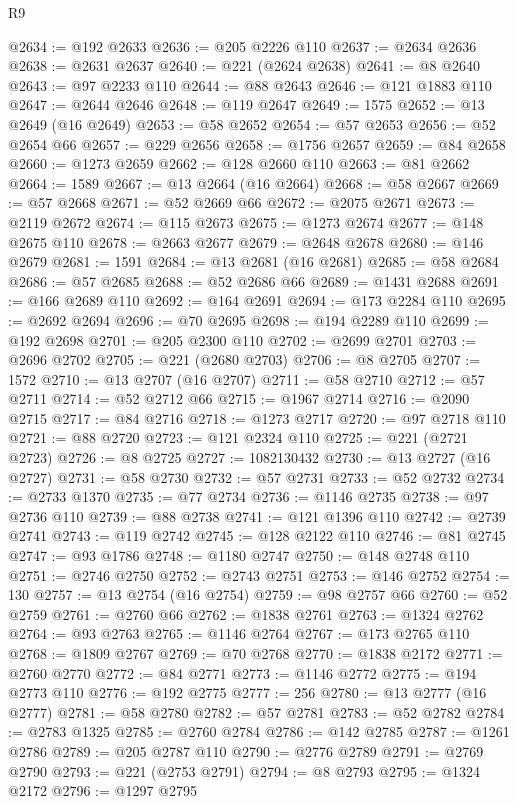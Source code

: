 \begin{lexlean}{R9}
\begin{coremodule}
@2634 := @192 @2633
@2636 := @205 @2226 @110
@2637 := @2634 @2636
@2638 := @2631 @2637
@2640 := @221 (@2624 @2638)
@2641 := @8 @2640
@2643 := @97 @2233 @110
@2644 := @88 @2643
@2646 := @121 @1883 @110
@2647 := @2644 @2646
@2648 := @119 @2647
@2649 := 1575
@2652 := @13 @2649 (@16 @2649)
@2653 := @58 @2652
@2654 := @57 @2653
@2656 := @52 @2654 @66
@2657 := @229 @2656
@2658 := @1756 @2657
@2659 := @84 @2658
@2660 := @1273 @2659
@2662 := @128 @2660 @110
@2663 := @81 @2662
@2664 := 1589
@2667 := @13 @2664 (@16 @2664)
@2668 := @58 @2667
@2669 := @57 @2668
@2671 := @52 @2669 @66
@2672 := @2075 @2671
@2673 := @2119 @2672
@2674 := @115 @2673
@2675 := @1273 @2674
@2677 := @148 @2675 @110
@2678 := @2663 @2677
@2679 := @2648 @2678
@2680 := @146 @2679
@2681 := 1591
@2684 := @13 @2681 (@16 @2681)
@2685 := @58 @2684
@2686 := @57 @2685
@2688 := @52 @2686 @66
@2689 := @1431 @2688
@2691 := @166 @2689 @110
@2692 := @164 @2691
@2694 := @173 @2284 @110
@2695 := @2692 @2694
@2696 := @70 @2695
@2698 := @194 @2289 @110
@2699 := @192 @2698
@2701 := @205 @2300 @110
@2702 := @2699 @2701
@2703 := @2696 @2702
@2705 := @221 (@2680 @2703)
@2706 := @8 @2705
@2707 := 1572
@2710 := @13 @2707 (@16 @2707)
@2711 := @58 @2710
@2712 := @57 @2711
@2714 := @52 @2712 @66
@2715 := @1967 @2714
@2716 := @2090 @2715
@2717 := @84 @2716
@2718 := @1273 @2717
@2720 := @97 @2718 @110
@2721 := @88 @2720
@2723 := @121 @2324 @110
@2725 := @221 (@2721 @2723)
@2726 := @8 @2725
@2727 := 1082130432
@2730 := @13 @2727 (@16 @2727)
@2731 := @58 @2730
@2732 := @57 @2731
@2733 := @52 @2732
@2734 := @2733 @1370
@2735 := @77 @2734
@2736 := @1146 @2735
@2738 := @97 @2736 @110
@2739 := @88 @2738
@2741 := @121 @1396 @110
@2742 := @2739 @2741
@2743 := @119 @2742
@2745 := @128 @2122 @110
@2746 := @81 @2745
@2747 := @93 @1786
@2748 := @1180 @2747
@2750 := @148 @2748 @110
@2751 := @2746 @2750
@2752 := @2743 @2751
@2753 := @146 @2752
@2754 := 130
@2757 := @13 @2754 (@16 @2754)
@2759 := @98 @2757 @66
@2760 := @52 @2759
@2761 := @2760 @66
@2762 := @1838 @2761
@2763 := @1324 @2762
@2764 := @93 @2763
@2765 := @1146 @2764
@2767 := @173 @2765 @110
@2768 := @1809 @2767
@2769 := @70 @2768
@2770 := @1838 @2172
@2771 := @2760 @2770
@2772 := @84 @2771
@2773 := @1146 @2772
@2775 := @194 @2773 @110
@2776 := @192 @2775
@2777 := 256
@2780 := @13 @2777 (@16 @2777)
@2781 := @58 @2780
@2782 := @57 @2781
@2783 := @52 @2782
@2784 := @2783 @1325
@2785 := @2760 @2784
@2786 := @142 @2785
@2787 := @1261 @2786
@2789 := @205 @2787 @110
@2790 := @2776 @2789
@2791 := @2769 @2790
@2793 := @221 (@2753 @2791)
@2794 := @8 @2793
@2795 := @1324 @2172
@2796 := @1297 @2795

\end{coremodule}
\end{lexlean}
